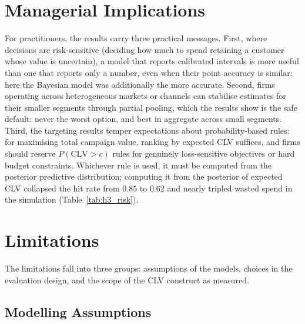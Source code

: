 \section{Managerial Implications}
\label{sec:managerial}

For practitioners, the results carry three practical messages. First, where decisions are risk-sensitive (deciding how much to spend retaining a customer whose value is uncertain), a model that reports calibrated intervals is more useful than one that reports only a number, even when their point accuracy is similar; here the Bayesian model was additionally the more accurate. Second, firms operating across heterogeneous markets or channels can stabilise estimates for their smaller segments through partial pooling, which the results show is the safe default: never the worst option, and best in aggregate across small segments. Third, the targeting results temper expectations about probability-based rules: for maximising total campaign value, ranking by expected CLV suffices, and firms should reserve $P(\text{CLV} > c)$ rules for genuinely loss-sensitive objectives or hard budget constraints. Whichever rule is used, it must be computed from the posterior predictive distribution; computing it from the posterior of expected CLV collapsed the hit rate from $0.85$ to $0.62$ and nearly tripled wasted spend in the simulation (Table~\ref{tab:h3_risk}).

\section{Limitations}
\label{sec:limitations}

The limitations fall into three groups: assumptions of the models, choices in the evaluation design, and the scope of the CLV construct as measured.

\subsection{Modelling Assumptions}
\label{sec:limitations-model}

